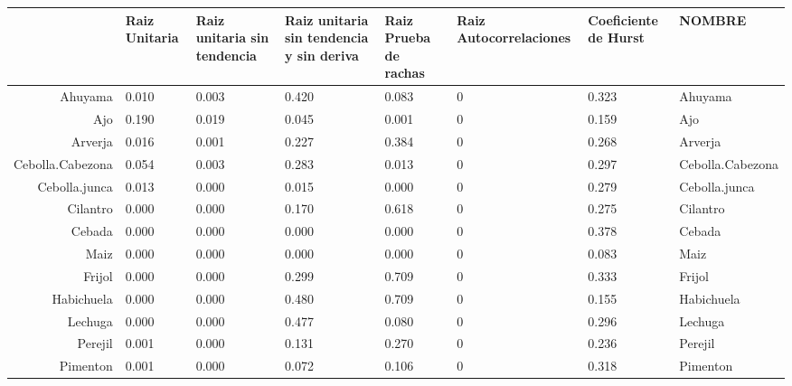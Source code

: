 \documentclass[11pt]{article}
\begin{document}
    \begin{tabular}{r|lllllll}
  & Raiz Unitaria & Raiz unitaria sin tendencia & Raiz unitaria sin tendencia y sin deriva & Raiz Prueba de rachas & Raiz Autocorrelaciones & Coeficiente de Hurst & NOMBRE\\
\hline
	Ahuyama & 0.010            & 0.003            & 0.420            & 0.083            & 0                & 0.323            & Ahuyama         \\
	Ajo & 0.190            & 0.019            & 0.045            & 0.001            & 0                & 0.159            & Ajo             \\
	Arverja & 0.016            & 0.001            & 0.227            & 0.384            & 0                & 0.268            & Arverja         \\
	Cebolla.Cabezona & 0.054            & 0.003            & 0.283            & 0.013            & 0                & 0.297            & Cebolla.Cabezona\\
	Cebolla.junca & 0.013            & 0.000            & 0.015            & 0.000            & 0                & 0.279            & Cebolla.junca   \\
	Cilantro & 0.000            & 0.000            & 0.170            & 0.618            & 0                & 0.275            & Cilantro        \\
	Cebada & 0.000            & 0.000            & 0.000            & 0.000            & 0                & 0.378            & Cebada          \\
	Maiz & 0.000            & 0.000            & 0.000            & 0.000            & 0                & 0.083            & Maiz            \\
	Frijol & 0.000            & 0.000            & 0.299            & 0.709            & 0                & 0.333            & Frijol          \\
	Habichuela & 0.000            & 0.000            & 0.480            & 0.709            & 0                & 0.155            & Habichuela      \\
	Lechuga & 0.000            & 0.000            & 0.477            & 0.080            & 0                & 0.296            & Lechuga         \\
	Perejil & 0.001            & 0.000            & 0.131            & 0.270            & 0                & 0.236            & Perejil         \\
	Pimenton & 0.001            & 0.000            & 0.072            & 0.106            & 0                & 0.318            & Pimenton        \\

\end{tabular}
\end{document}
